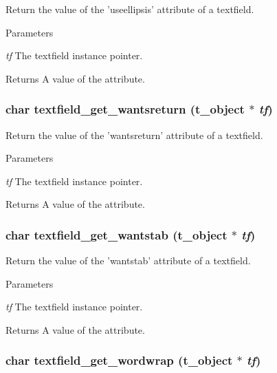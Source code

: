 Return the value of the 'useellipsis' attribute of a textfield. 
\begin{DoxyParams}{Parameters}
\item[{\em tf}]The textfield instance pointer. \end{DoxyParams}
\begin{DoxyReturn}{Returns}
A value of the attribute. 
\end{DoxyReturn}
\hypertarget{group__textfield_ga3252a03aaa64615f51931d0413baf69a}{
\subsubsection[{textfield\_\-get\_\-wantsreturn}]{\setlength{\rightskip}{0pt plus 5cm}char textfield\_\-get\_\-wantsreturn ({\bf t\_\-object} $\ast$ {\em tf})}}
\label{group__textfield_ga3252a03aaa64615f51931d0413baf69a}


Return the value of the 'wantsreturn' attribute of a textfield. 
\begin{DoxyParams}{Parameters}
\item[{\em tf}]The textfield instance pointer. \end{DoxyParams}
\begin{DoxyReturn}{Returns}
A value of the attribute. 
\end{DoxyReturn}
\hypertarget{group__textfield_gaeb5fe0ef24f412513bed187ea80830c9}{
\subsubsection[{textfield\_\-get\_\-wantstab}]{\setlength{\rightskip}{0pt plus 5cm}char textfield\_\-get\_\-wantstab ({\bf t\_\-object} $\ast$ {\em tf})}}
\label{group__textfield_gaeb5fe0ef24f412513bed187ea80830c9}


Return the value of the 'wantstab' attribute of a textfield. 
\begin{DoxyParams}{Parameters}
\item[{\em tf}]The textfield instance pointer. \end{DoxyParams}
\begin{DoxyReturn}{Returns}
A value of the attribute. 
\end{DoxyReturn}
\hypertarget{group__textfield_ga8e978f15933a5209063a30c5925a21ff}{
\subsubsection[{textfield\_\-get\_\-wordwrap}]{\setlength{\rightskip}{0pt plus 5cm}char textfield\_\-get\_\-wordwrap ({\bf t\_\-object} $\ast$ {\em tf})}}
\label{group__textfield_ga8e978f15933a5209063a30c5925a21ff}


